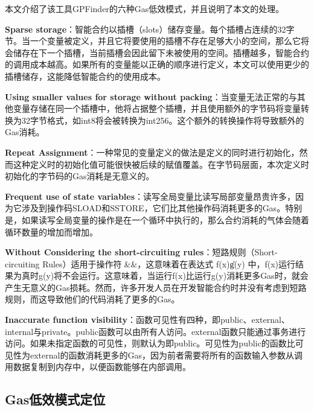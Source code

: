 本文介绍了该工具GPFinder的六种Gas低效模式，并且说明了本文的处理。

\textbf{Sparse storage}：智能合约以插槽（slots）储存变量。每个插槽占连续的32字节。当一个变量被定义，并且它将要使用的插槽不存在足够大小的空间，那么它将会储存在下一个插槽，当前插槽会因此留下未被使用的空间。插槽越多，智能合约的调用成本越高。如果所有的变量能以正确的顺序进行定义，本文可以使用更少的插槽储存，这能降低智能合约的使用成本。

\textbf{Using smaller values for storage without packing}：当变量无法正常的与其他变量存储在同一个插槽中，他将占据整个插槽，并且使用额外的字节码将变量转换为32字节格式，如int8将会被转换为int256。这个额外的转换操作将导致额外的Gas消耗。

\textbf{Repeat Assignment}：一种常见的变量定义的做法是定义的同时进行初始化，然而这种定义时的初始化值可能很快被后续的赋值覆盖。在字节码层面，本次定义时初始化的字节码的Gas消耗是无意义的。

\textbf{Frequent use of state variables}：读写全局变量比读写局部变量昂贵许多，因为它涉及到操作码SLOAD和SSTORE，它们比其他操作码消耗更多的Gas。特别是，如果读写全局变量的操作是在一个循环中执行的，那么合约消耗的气体会随着循环数量的增加而增加。

\textbf{Without Considering the short-circuiting rules}：短路规则（Short-circuiting Rules）适用于操作符\|\|和\&\&，这意味着在表达式 f(x)\|\| g(y) 中，f(x)运行结果为真时g(y)将不会运行。这意味着，当运行f(x)比运行g(y)消耗更多Gas时，就会产生无意义的Gas损耗。然而，许多开发人员在开发智能合约时并没有考虑到短路规则，而这导致他们的代码消耗了更多的Gas。

\textbf{Inaccurate function visibility}：函数可见性有四种，即public、external、internal与private。public函数可以由所有人访问。external函数只能通过事务进行访问。如果未指定函数的可见性，则默认为即public。可见性为public的函数比可见性为external的函数消耗更多的Gas，因为前者需要将所有的函数输入参数从调用数据复制到内存中，以便函数能够在内部调用。

\subsection{Gas低效模式定位}

